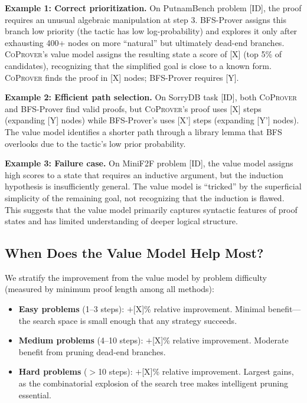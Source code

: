 \documentclass{article}
\newcommand{\coprover}{\textsc{CoProver}}
\begin{document}
\textbf{Example 1: Correct prioritization.} On PutnamBench problem [ID], the proof requires an unusual algebraic manipulation at step 3. BFS-Prover assigns this branch low priority (the tactic has low log-probability) and explores it only after exhausting 400+ nodes on more ``natural'' but ultimately dead-end branches. \coprover{}'s value model assigns the resulting state a score of [X] (top 5\% of candidates), recognizing that the simplified goal is close to a known form. \coprover{} finds the proof in [X] nodes; BFS-Prover requires [Y].

\textbf{Example 2: Efficient path selection.} On SorryDB task [ID], both \coprover{} and BFS-Prover find valid proofs, but \coprover{}'s proof uses [X] steps (expanding [Y] nodes) while BFS-Prover's uses [X'] steps (expanding [Y'] nodes). The value model identifies a shorter path through a library lemma that BFS overlooks due to the tactic's low prior probability.

\textbf{Example 3: Failure case.} On MiniF2F problem [ID], the value model assigns high scores to a state that requires an inductive argument, but the induction hypothesis is insufficiently general. The value model is ``tricked'' by the superficial simplicity of the remaining goal, not recognizing that the induction is flawed. This suggests that the value model primarily captures syntactic features of proof states and has limited understanding of deeper logical structure.

\subsection{When Does the Value Model Help Most?}

We stratify the improvement from the value model by problem difficulty (measured by minimum proof length among all methods):

\begin{itemize}
    \item \textbf{Easy problems} (1--3 steps): $+$[X]\% relative improvement. Minimal benefit---the search space is small enough that any strategy succeeds.
    \item \textbf{Medium problems} (4--10 steps): $+$[X]\% relative improvement. Moderate benefit from pruning dead-end branches.
    \item \textbf{Hard problems} ($>$10 steps): $+$[X]\% relative improvement. Largest gains, as the combinatorial explosion of the search tree makes intelligent pruning essential.
\end{itemize}
\end{document}

